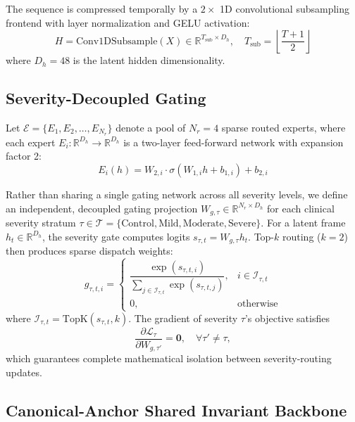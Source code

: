 \documentclass[10pt,twocolumn]{article}
\begin{document}
The sequence is compressed temporally by a $2\times$ 1D convolutional subsampling frontend with layer normalization and GELU activation:
\begin{equation}
    H = \text{Conv1DSubsample}(X) \in \mathbb{R}^{T_{\text{sub}} \times D_h}, \quad T_{\text{sub}} = \left\lfloor \frac{T + 1}{2} \right\rfloor
\end{equation}
where $D_h = 48$ is the latent hidden dimensionality.

\subsection{Severity-Decoupled Gating}

Let $\mathcal{E} = \{E_1, E_2, \dots, E_{N_r}\}$ denote a pool of $N_r = 4$ sparse routed experts, where each expert $E_i: \mathbb{R}^{D_h} \to \mathbb{R}^{D_h}$ is a two-layer feed-forward network with expansion factor 2:
\begin{equation}
    E_i(h) = W_{2, i} \cdot \sigma(W_{1, i} h + b_{1, i}) + b_{2, i}
\end{equation}

Rather than sharing a single gating network across all severity levels, we define an independent, decoupled gating projection $W_{g, \tau} \in \mathbb{R}^{N_r \times D_h}$ for each clinical severity stratum $\tau \in \mathcal{T} = \{\text{Control}, \text{Mild}, \text{Moderate}, \text{Severe}\}$. For a latent frame $h_t \in \mathbb{R}^{D_h}$, the severity gate computes logits $s_{\tau, t} = W_{g, \tau} h_t$. Top-$k$ routing ($k=2$) then produces sparse dispatch weights:
\begin{equation}
    g_{\tau, t, i} = \begin{cases}
    \dfrac{\exp(s_{\tau, t, i})}{\sum_{j \in \mathcal{I}_{\tau, t}} \exp(s_{\tau, t, j})}, & i \in \mathcal{I}_{\tau, t} \\[6pt]
    0, & \text{otherwise}
    \end{cases}
\end{equation}
where $\mathcal{I}_{\tau, t} = \text{TopK}(s_{\tau, t}, k)$. The gradient of severity $\tau$'s objective satisfies
\begin{equation}
    \frac{\partial \mathcal{L}_{\tau}}{\partial W_{g, \tau'}} = \mathbf{0}, \quad \forall \tau' \neq \tau,
\end{equation}
which guarantees complete mathematical isolation between severity-routing updates.

\subsection{Canonical-Anchor Shared Invariant Backbone}
\end{document}
